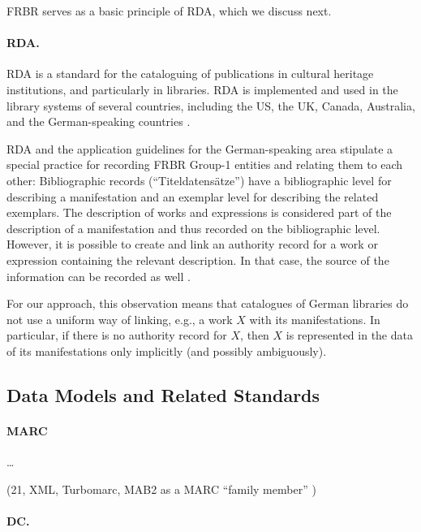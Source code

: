FRBR serves as a basic principle of RDA, which we discuss next.

\paragraph{RDA.}

\gls{RDA} is a standard for the cataloguing of publications
in cultural heritage institutions, and particularly in libraries.
RDA is implemented and used in the library systems of several countries, including
the US, the UK, Canada, Australia, and the German-speaking countries
\autocite{WikiDE_RDA}.

RDA and the application guidelines for the German-speaking area
stipulate a special practice for recording FRBR Group-1 entities and relating 
them to each other: Bibliographic records (\enquote{Titeldatensätze})
have a bibliographic level for describing a manifestation
and an exemplar level for describing the related exemplars. The description of works and expressions
is considered part of the description of a manifestation and thus recorded on the bibliographic level.
However, it is possible to create and link an authority record for a work or expression
containing the relevant description. In that case, the source of the information can be recorded as well
\autocite[cf.][§5.1]{Wiesenmueller2015}.

For our approach, this observation means that catalogues of German libraries
do not use a uniform way of linking, e.g., a work $X$ with its manifestations.
In particular, if there is no authority record for $X$,
then $X$ is represented in the data of its manifestations only implicitly 
(and possibly ambiguously).

\subsection{Data Models and Related Standards}

\paragraph{MARC}

\dots

(21, XML, Turbomarc, MAB2 as a MARC \enquote{family member} \autocite[p.204]{Hider2008})

\paragraph{DC.}

